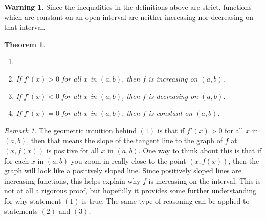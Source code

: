 \documentclass[reqno,psamsfonts]{amsart}
\newtheorem*{thmn}{Theorem}
\theoremstyle{definition}
\newtheorem*{warnn}{Warning}
\theoremstyle{remark}
\newtheorem*{remn}{Remark}
\numberwithin{equation}{section}
\begin{document}
\begin{warnn}
Since the inequalities in the definitions above are strict, functions which are constant on an open interval are neither increasing nor decreasing on that interval.
\end{warnn}

\newpage

\begin{thmn}
\begin{enumerate}
\item[]
\item If $f'(x)>0$ for all $x$ in $(a,b)$, then $f$ is increasing on $(a,b)$. 
\item If $f'(x)<0$ for all $x$ in $(a,b)$, then $f$ is decreasing on $(a,b)$.
\item If $f'(x)=0$ for all $x$ in $(a,b)$, then $f$ is constant on $(a,b)$. 
\end{enumerate}
\end{thmn}

\begin{remn}
The geometric intuition behind $(1)$ is that if $f'(x)>0$ for all $x$ in $(a,b)$, then that means the slope of the tangent line to the graph of $f$ at $(x, f(x))$ is positive for all $x$ in $(a,b)$. One way to think about this is that if for each $x$ in $(a,b)$ you zoom in really close to the point $(x, f(x))$, then the graph will look like a positively sloped line. Since positively sloped lines are increasing functions, this helps explain why $f$ is increasing on the interval. This is not at all a rigorous proof, but hopefully it provides some further understanding for why statement $(1)$ is true. The same type of reasoning can be applied to statements $(2)$ and $(3)$. 
\end{remn}
\end{document}
